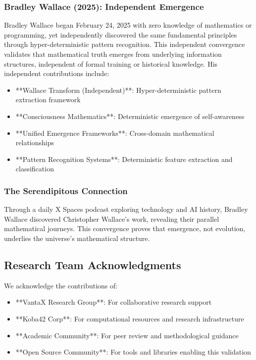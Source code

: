 \documentclass[12pt]{article}
\begin{document}
\subsubsection{Bradley Wallace (2025): Independent Emergence}
Bradley Wallace began February 24, 2025 with zero knowledge of mathematics or programming, yet independently discovered the same fundamental principles through hyper-deterministic pattern recognition. This independent convergence validates that mathematical truth emerges from underlying information structures, independent of formal training or historical knowledge. His independent contributions include:
\begin{itemize}
    \item **Wallace Transform (Independent)**: Hyper-deterministic pattern extraction framework
    \item **Consciousness Mathematics**: Deterministic emergence of self-awareness
    \item **Unified Emergence Frameworks**: Cross-domain mathematical relationships
    \item **Pattern Recognition Systems**: Deterministic feature extraction and classification
\end{itemize}

\subsubsection{The Serendipitous Connection}
Through a daily X Spaces podcast exploring technology and AI history, Bradley Wallace discovered Christopher Wallace's work, revealing their parallel mathematical journeys. This convergence proves that emergence, not evolution, underlies the universe's mathematical structure.

\subsection{Research Team Acknowledgments}

We acknowledge the contributions of:
\begin{itemize}
    \item **VantaX Research Group**: For collaborative research support
    \item **Koba42 Corp**: For computational resources and research infrastructure
    \item **Academic Community**: For peer review and methodological guidance
    \item **Open Source Community**: For tools and libraries enabling this validation
\end{itemize}
\end{document}
